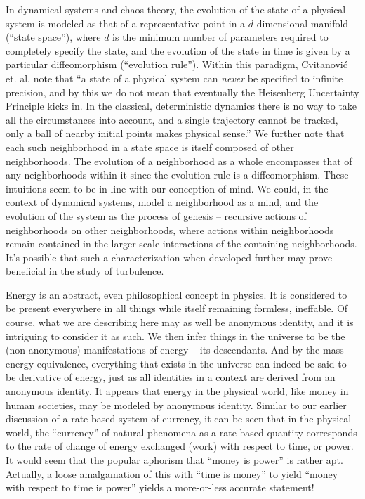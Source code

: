 \documentclass[pra,twocolumn,groupedaddress,10pt]{revtex4}
\theoremstyle{definition}
\begin{document}
In dynamical systems and chaos theory, the evolution of the state of a physical system is modeled as that of a representative point in a $d$-dimensional manifold (``state space''), where $d$ is the minimum number of parameters required to completely specify the state, and the evolution of the state in time is given by a particular diffeomorphism (``evolution rule''). Within this paradigm, Cvitanovi\'{c} et. al.\cite{chaosbook} note that ``a state of a physical system can \textit{never} be specified to infinite precision, and by this we do not mean that eventually the Heisenberg Uncertainty Principle kicks in. In the classical, deterministic dynamics there is no way to take all the circumstances into account, and a single trajectory cannot be tracked, only a ball of nearby initial points makes physical sense.'' We further note that each such neighborhood in a state space is itself composed of other neighborhoods. The evolution of a neighborhood as a whole encompasses that of any neighborhoods within it since the evolution rule is a diffeomorphism. These intuitions seem to be in line with our conception of mind. We could, in the context of dynamical systems, model a neighborhood as a mind, and the evolution of the system as the process of genesis -- recursive actions of neighborhoods on other neighborhoods, where actions within neighborhoods remain contained in the larger scale interactions of the containing neighborhoods. It's possible that such a characterization when developed further may prove beneficial in the study of turbulence.

Energy is an abstract, even philosophical concept in physics. It is considered to be present everywhere in all things while itself remaining formless, ineffable. Of course, what we are describing here may as well be anonymous identity, and it is intriguing to consider it as such. We then infer things in the universe to be the (non-anonymous) manifestations of energy -- its descendants. And by the mass-energy equivalence, everything that exists in the universe can indeed be said to be derivative of energy, just as all identities in a context are derived from an anonymous identity. It appears that energy in the physical world, like money in human societies, may be modeled by anonymous identity. Similar to our earlier discussion of a rate-based system of currency, it can be seen that in the physical world, the ``currency'' of natural phenomena as a rate-based quantity corresponds to the rate of change of energy exchanged (work) with respect to time, or power. It would seem that the popular aphorism that ``money is power'' is rather apt. Actually, a loose amalgamation of this with ``time is money'' to yield ``money with respect to time is power'' yields a more-or-less accurate statement!
\end{document}
